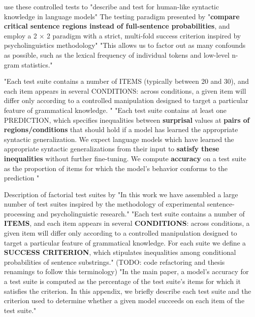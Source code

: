 \citet{hu2020systematic} use these controlled tests to "describe and test for human-like syntactic knowledge in language models"
The testing paradigm presented  by \citet{hu2020systematic} "\textbf{compare critical sentence regions instead of full-sentence probabilities}, and employ a 2 × 2 paradigm with a strict, multi-fold success criterion inspired by psycholinguistics methodology"  \citep{hu2020systematic}
"This allows us to factor out as many confounds as possible, such as the lexical frequency of individual tokens and low-level n-gram statistics."  \citep{hu2020systematic}

"Each test suite contains a number of ITEMS (typically between 20 and 30), and each item appears in several CONDITIONS: across conditions, a given item will differ only according to a controlled manipulation designed to target a particular feature of grammatical knowledge. " \citep{hu2020systematic}
"Each test suite contains at least one PREDICTION, which specifies inequalities between \textbf{surprisal} values at \textbf{pairs of regions/conditions} that should hold if a model has learned the appropriate syntactic generalization. We expect language models which have learned the appropriate syntactic generalizations from their input to \textbf{satisfy these inequalities} without further fine-tuning. We compute \textbf{accuracy} on a test suite as
the proportion of items for which the model’s behavior conforms to the prediction "  \citep{hu2020systematic}

Description of factorial test suites by \citet{hu2020systematic} 
"In this work we have assembled a large number of test suites inspired by the methodology of experimental sentence-processing and psycholinguistic research." \citep{hu2020systematic} 
"Each test suite contains a number of \textbf{ITEMS}, and each item appears in several \textbf{CONDITIONS}: across conditions, a given item will differ only according to a controlled manipulation designed to target a particular feature of grammatical  knowledge. For each suite we define a \textbf{SUCCESS
	CRITERION}, which stipulates inequalities among conditional probabilities of sentence substrings."\citep{hu2020systematic} 
(TODO: code refactoring and thesis renamings to follow this terminology)
"In the main paper, a model’s accuracy for a test
suite is computed as the percentage of the test
suite’s items for which it satisfies the criterion. In
this appendix, we briefly describe each test suite
and the criterion used to determine whether a given
model succeeds on each item of the test suite." \citep{hu2020systematic} 

